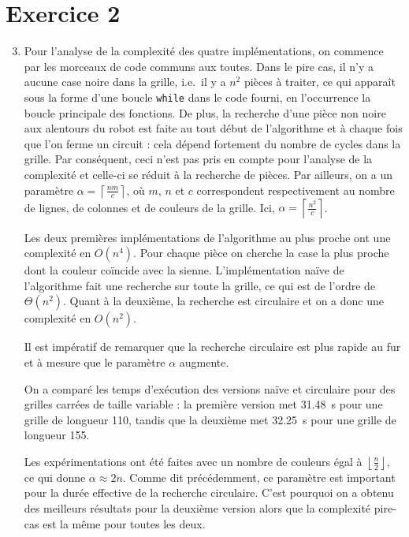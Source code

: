 \documentclass[12pt,a4paper]{article}
\begin{document}
\section{Exercice 2}
\begin{enumerate}
\setcounter{enumi}{2}
\item Pour l'analyse de la complexit\'e des quatre impl\'ementations, on 
commence par les morceaux de code communs aux toutes. Dans le pire cas, 
il n'y a aucune case noire dans la grille, i.e.\ il y a $n^2$ pi\`eces \`a 
traiter, ce qui appara\^it sous la forme d'une boucle \texttt{while} dans le 
code fourni, en l'occurrence la boucle principale des fonctions. De 
plus, la recherche d'une pi\`ece non noire aux alentours du robot est faite au 
tout d\'ebut de l'algorithme et \`a chaque fois que l'on ferme un 
circuit : cela d\'epend fortement du nombre de cycles dans la grille. Par 
cons\'equent, ceci n'est pas pris en compte pour l'analyse de la complexit\'e et 
celle-ci se r\'eduit \`a la recherche de pi\`eces. Par ailleurs, on a un 
param\`etre $\alpha = \left \lceil \frac{nm}{c} 
\right \rceil$, o\`u $m$, $n$ et $c$ correspondent respectivement au nombre 
de lignes, de colonnes et de couleurs de la grille. Ici, $\alpha = \left \lceil 
\frac{n^2}{c} \right \rceil$.\par
Les deux premi\`eres impl\'ementations de l'algorithme au plus proche ont une 
complexit\'e en $O(n^4)$. Pour chaque pi\`ece on cherche la case la plus proche 
dont la couleur co\"incide avec la sienne. L'impl\'ementation na\"ive de 
l'algorithme fait une recherche sur toute la grille, ce qui est de l'ordre de 
$\Theta(n^2)$. Quant \`a la deuxi\`eme, la recherche est circulaire et on a donc 
une complexit\'e en $O(n^2)$.

Il est imp\'eratif de remarquer que la recherche circulaire est 
plus rapide au fur et \`a mesure que le param\`etre $\alpha$ augmente. \par
On a compar\'e les temps d'ex\'ecution des versions na\"ive et circulaire pour 
des grilles carr\'ees de taille variable : la premi\`ere version met 
\SI{31,48}{\second} pour une grille de longueur 110, tandis que la deuxi\`eme 
met \SI{32,25}{\second} pour une grille de longueur 155.

Les exp\'erimentations ont \'et\'e faites avec un nombre de couleurs \'egal \`a 
$\left \lfloor \frac{n}{2} \right \rfloor$, ce qui donne $\alpha \approx 2n$. 
Comme dit pr\'ec\'edemment, ce param\`etre est important pour la dur\'ee 
effective de la recherche circulaire. C'est pourquoi on a obtenu des meilleurs 
r\'esultats pour la deuxi\`eme version alors que la complexit\'e pire-cas est 
la m\^eme pour toutes les deux.
\end{enumerate}
\end{document}
